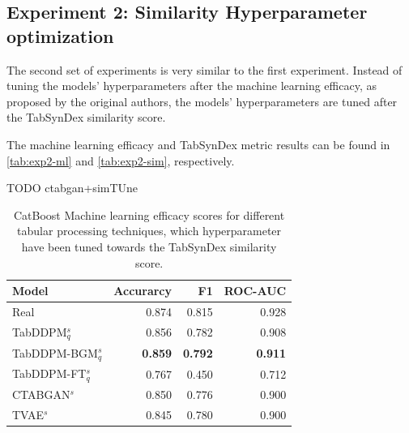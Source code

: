 \subsection{Experiment 2: Similarity Hyperparameter optimization}
\label{ch:Experiment-2}

The second set of experiments is very similar to the first experiment.
Instead of tuning the models' hyperparameters after the machine learning efficacy, as proposed by the original authors,
the models' hyperparameters are tuned after the TabSynDex similarity score.

The machine learning efficacy and TabSynDex metric results can be found in \autoref{tab:exp2-ml} and \autoref{tab:exp2-sim}, respectively.

TODO ctabgan+simTUne

\begin{table}[h]
	\centering
	\begin{tabular}{lrrr}
		\toprule
		\textbf{Model}        & \textbf{Accurarcy} & \textbf{F1}    & \textbf{ROC-AUC} \\
		\midrule
		Real                  & 0.874              & 0.815          & 0.928            \\
		TabDDPM$^{s}_{q}$     & 0.856              & 0.782          & 0.908            \\
		TabDDPM-BGM$^{s}_{q}$ & \textbf{0.859}     & \textbf{0.792} & \textbf{0.911}   \\
		TabDDPM-FT$^{s}_{q}$  & 0.767              & 0.450          & 0.712            \\
		CTABGAN$^{s}$         & 0.850              & 0.776          & 0.900            \\
		TVAE$^{s}$            & 0.845              & 0.780          & 0.900            \\
		\bottomrule
	\end{tabular}
	\caption[Experiment2-ML-Efficacy]{CatBoost Machine learning efficacy scores for different tabular processing techniques, which hyperparameter have been tuned towards the TabSynDex similarity score.}
	\label{tab:exp2-ml}
\end{table}

